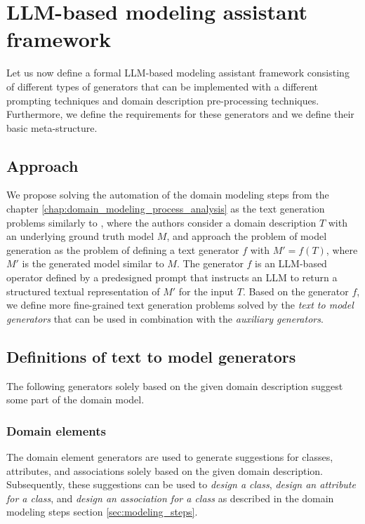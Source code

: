 \chapter{LLM-based modeling assistant framework}
\label{chap:framework}

Let us now define a formal LLM-based modeling assistant framework consisting of different types of generators that can be implemented with a different prompting techniques and domain description pre-processing techniques. Furthermore, we define the requirements for these generators and we define their basic meta-structure.


\section{Approach}

We propose solving the automation of the domain modeling steps from the chapter \ref{chap:domain_modeling_process_analysis} as the text generation problems similarly to \citet{Chen2023}, where the authors consider a domain description $T$ with an underlying ground truth model $M$, and approach the problem of model generation as the problem of defining a text generator $f$ with $M' = f(T)$, where $M'$ is the generated model similar to $M$. The generator $f$ is an LLM-based operator defined by a predesigned prompt that instructs an LLM to return a structured textual representation of $M'$ for the input $T$. Based on the generator $f$, we define more fine-grained text generation problems solved by the \emph{text to model generators} that can be used in combination with the \emph{auxiliary generators}.


\section{Definitions of text to model generators}

The following generators solely based on the given domain description suggest some part of the domain model.


\subsection{Domain elements}

The domain element generators are used to generate suggestions for classes, attributes, and associations solely based on the given domain description. Subsequently, these suggestions can be used to \emph{design a class}, \emph{design an attribute for a class}, and \emph{design an association for a class} as described in the domain modeling steps section \ref{sec:modeling_steps}.

